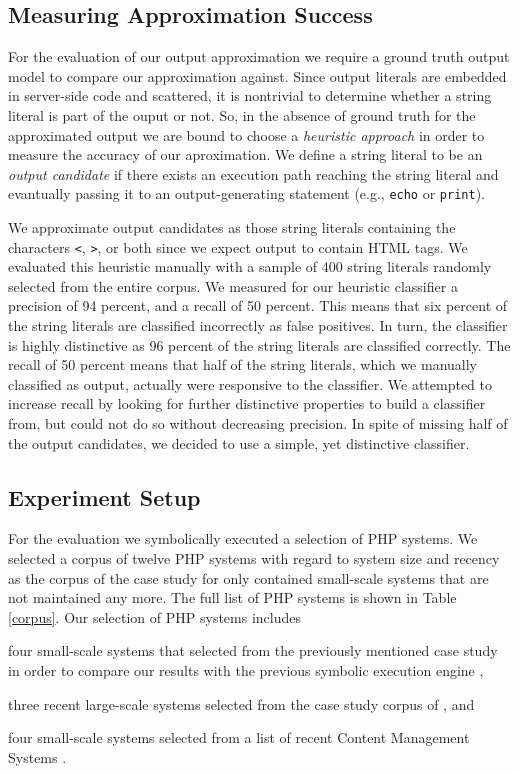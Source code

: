 \documentclass[preprint]{sig-alternate-05-2015}
\begin{document}
\subsection{Measuring Approximation Success} \label{heuristic}
For the evaluation of our output approximation we require a ground truth output
model to compare our approximation against. Since output literals are embedded
in server-side code and scattered, it is nontrivial to determine whether a
string literal is part of the ouput or not. So, in the absence of ground truth
for the approximated output we are bound to choose a \emph{heuristic approach}
in order to measure the accuracy of our aproximation. We define a string
literal to be an \emph{output candidate} if there exists an execution path
reaching the string literal and evantually passing it to an output-generating
statement (e.g., \texttt{echo} or \texttt{print}).

We approximate output candidates as those string literals containing the
characters \texttt{<}, \texttt{>}, or both since we expect output to contain
HTML tags. We evaluated this heuristic manually with a sample of 400 string
literals randomly selected from the entire corpus.
We measured for our heuristic classifier a precision of 94 percent, and a
recall of 50 percent. This means that six percent of the string literals are
classified incorrectly as false positives. In turn, the classifier is highly
distinctive as 96 percent of the string literals are classified correctly. The
recall of 50 percent means that half of the string literals, which we manually 
classified as output, actually were responsive to the classifier. We attempted
to increase recall by looking for further distinctive properties to build a
classifier from, but could not do so without decreasing precision. In spite of
missing half of the output candidates, we decided to use a simple, yet
distinctive classifier.

\subsection{Experiment Setup} 
For the evaluation we symbolically executed a selection of PHP systems. We
selected a corpus of twelve PHP systems with regard to system size and recency
as the corpus of the case study for \cite{Nguyen:2014:BCG:2635868.2635928} only
contained small-scale systems that are not maintained any more. The full list
of PHP systems is shown in Table \ref{corpus}. Our selection of PHP systems
includes

%
\begin{compactitem}
	\item four small-scale systems that selected from the previously mentioned case
	study in order to compare our results with the previous symbolic execution
	engine \cite{Nguyen:2014:BCG:2635868.2635928},

	\item three recent large-scale systems selected from the case study corpus of
	\cite{Hills:2013:ESP:2483760.2483786}, and
	
	\item four small-scale systems selected from a list of recent Content
	Management Systems \cite{codegeekz}.
\end{compactitem}
\end{document}
